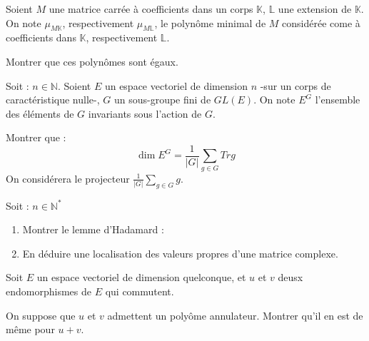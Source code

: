 \begin{exer}
Soient $M$ une matrice carrée à coefficients dans un corps $\mathbb{K}$, $\mathbb{L}$ une extension de $\mathbb{K}$.\\
On note $\mu_{M \mathbb{K}}$, respectivement $\mu_{M \mathbb{L}}$, le polynôme minimal de $M$ considérée come à coefficients dans $\mathbb{K}$, respectivement $\mathbb{L}$.

Montrer que ces polynômes sont égaux.
\end{exer}

\begin{exer}
Soit : $n \in \mathbb{N}$. %
Soient $E$ un espace vectoriel de dimension $n$ -sur un corps de caractéristique nulle-, $G$ un sous-groupe fini de $GL(E)$. %
On note $E^G$ l'ensemble des éléments de $G$ invariants sous l'action de $G$.

Montrer que :\[\dim E^G = \frac{1}{|G|} \sum\limits_{g \in G} Tr g\]
On considérera le projecteur $\frac{1}{|G|} \sum\limits_{g \in G} g$. 
\end{exer}

\begin{exer}
Soit : $n \in \mathbb{N}^{\ast}$
\begin{enumerate}
\item Montrer le lemme d'Hadamard :
\begin{center}
\end{center}
\item En déduire une localisation des valeurs propres d'une matrice complexe.
\end{enumerate}
\end{exer}

\begin{exer}
Soit $E$ un espace vectoriel de dimension quelconque, et $u$ et $v$ deusx endomorphismes de $E$ qui commutent.

On suppose que $u$ et $v$ admettent un polyôme annulateur. Montrer qu'il en est de même pour $u+v$.
\end{exer}


